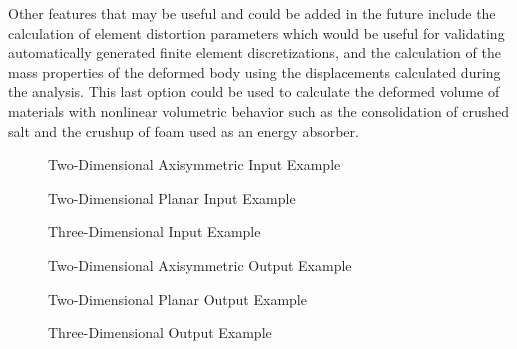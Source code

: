 Other features that may be useful and could be added in the future
include the calculation of element distortion parameters which would
be useful for validating automatically generated finite element
discretizations, and the calculation of the mass properties of the
deformed body using the displacements calculated during the analysis.
This last option could be used to calculate the deformed volume of
materials with nonlinear volumetric behavior such as the consolidation
of crushed salt and the crushup of foam used as an energy absorber.
\clearpage
\begin{figure}

\caption{Two-Dimensional Axisymmetric Input Example}
\end{figure}
\begin{figure}

\caption{Two-Dimensional Planar Input Example}
\end{figure}
\begin{figure}

\caption{Three-Dimensional Input Example}
\end{figure}
\begin{figure}

\caption{Two-Dimensional Axisymmetric Output Example}
\end{figure}
\begin{figure}

\caption{Two-Dimensional Planar Output Example}
\end{figure}
\begin{figure}

\caption{Three-Dimensional Output Example}
\end{figure}
